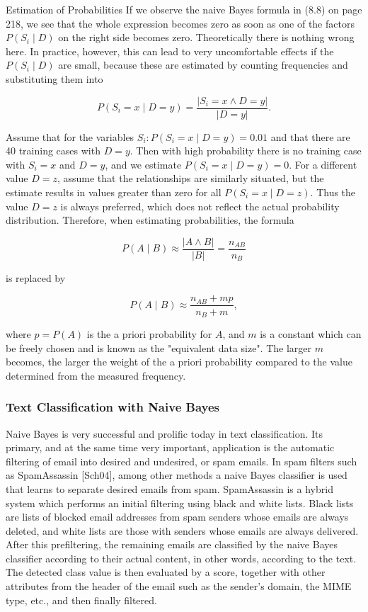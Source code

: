 \documentclass[10pt]{article}
\begin{document}
Estimation of Probabilities If we observe the naive Bayes formula in (8.8) on page 218, we see that the whole expression becomes zero as soon as one of the factors $P\left(S_{i} \mid D\right)$ on the right side becomes zero. Theoretically there is nothing wrong here. In practice, however, this can lead to very uncomfortable effects if the $P\left(S_{i} \mid D\right)$ are small, because these are estimated by counting frequencies and substituting them into

$$
P\left(S_{i}=x \mid D=y\right)=\frac{\left|S_{i}=x \wedge D=y\right|}{|D=y|} .
$$

Assume that for the variables $S_{i}: P\left(S_{i}=x \mid D=y\right)=0.01$ and that there are 40 training cases with $D=y$. Then with high probability there is no training case with $S_{i}=x$ and $D=y$, and we estimate $P\left(S_{i}=x \mid D=y\right)=0$. For a different value $D= z$, assume that the relationships are similarly situated, but the estimate results in values greater than zero for all $P\left(S_{i}=x \mid D=z\right)$. Thus the value $D=z$ is always preferred, which does not reflect the actual probability distribution. Therefore, when estimating probabilities, the formula

$$
P(A \mid B) \approx \frac{|A \wedge B|}{|B|}=\frac{n_{A B}}{n_{B}}
$$

is replaced by

$$
P(A \mid B) \approx \frac{n_{A B}+m p}{n_{B}+m},
$$

where $p=P(A)$ is the a priori probability for $A$, and $m$ is a constant which can be freely chosen and is known as the "equivalent data size". The larger $m$ becomes, the larger the weight of the a priori probability compared to the value determined from the measured frequency.

\subsubsection*{Text Classification with Naive Bayes}
Naive Bayes is very successful and prolific today in text classification. Its primary, and at the same time very important, application is the automatic filtering of email into desired and undesired, or spam emails. In spam filters such as SpamAssassin [Sch04], among other methods a naive Bayes classifier is used that learns to separate desired emails from spam. SpamAssassin is a hybrid system which performs an initial filtering using black and white lists. Black lists are lists of blocked email addresses from spam senders whose emails are always deleted, and white lists are those with senders whose emails are always delivered. After this prefiltering, the remaining emails are classified by the naive Bayes classifier according to their actual content, in other words, according to the text. The detected class value is then evaluated by a score, together with other attributes from the header of the email such as the sender's domain, the MIME type, etc., and then finally filtered.
\end{document}
